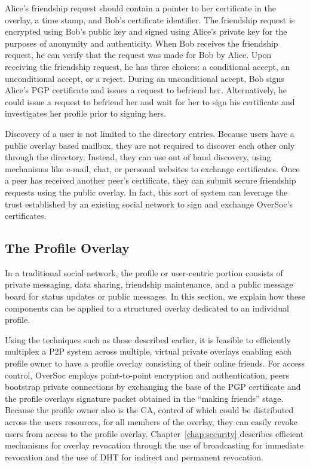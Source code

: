 Alice's friendship request should contain a pointer to her certificate in the
overlay, a time stamp, and Bob's certificate identifier.  The friendship
request is encrypted using Bob's public key and signed using Alice's private
key for the purposes of anonymity and authenticity.  When Bob receives the
friendship request, he can verify that the request was made for Bob by Alice.
Upon receiving the friendship request, he has three choices:  a conditional
accept, an unconditional accept, or a reject.  During an unconditional accept,
Bob signs Alice's PGP certificate and issues a request to befriend her.
Alternatively, he could issue a request to befriend her and wait for her to
sign his certificate and investigates her profile prior to signing hers.

Discovery of a user is not limited to the directory entries.  Because users
have a public overlay based mailbox, they are not required to discover each
other only through the directory.  Instead, they can use out of band discovery,
using mechanisms like e-mail, chat, or personal websites to exchange
certificates.  Once a peer has received another peer's certificate, they can
submit secure friendship requests using the public overlay.  In fact, this sort
of system can leverage the trust established by an existing social network to
sign and exchange OverSoc's certificates.  

\subsection{The Profile Overlay}
\label{vpo:profile_overlay}

In a traditional social network, the profile or user-centric portion consists
of private messaging, data sharing, friendship maintenance, and a public
message board for status updates or public messages.  In this section, we
explain how these components can be applied to a structured overlay dedicated
to an individual profile.

Using the techniques such as those described earlier, it is feasible to
efficiently multiplex a P2P system across multiple, virtual private overlays
enabling each profile owner to have a profile overlay consisting of their
online friends.  For access control, OverSoc employs point-to-point encryption
and authentication, peers bootstrap private connections by exchanging the base
of the PGP certificate and the profile overlays signature packet obtained in
the ``making friends'' stage.  Because the profile owner also is the CA,
control of which could be distributed across the users resources, for all
members of the overlay, they can easily revoke users from access to the profile
overlay.  Chapter~\ref{chap:security} describes efficient mechanisms for
overlay revocation through the use of broadcasting for immediate revocation and
the use of DHT for indirect and permanent revocation.

